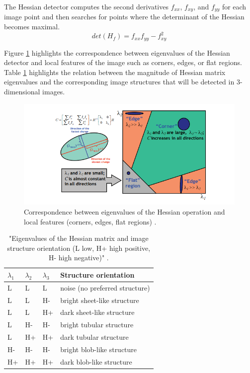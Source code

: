 The Hessian detector computes the second derivatives $f_{xx}$, $f_{xy}$, and $f_{yy}$ for each image point and then searches for points where the determinant of the Hessian becomes maximal.
\begin{equation}
det(H_f)= f_{xx}f_{yy}-f_{xy}^2
\end{equation}

Figure \ref{fig:hessian_app} highlights the correspondence between eigenvalues of the Hessian detector and local features of the image such as corners, edges, or flat regions. Table \ref{tab:hessian} highlights the relation between the magnitude of Hessian matrix eigenvalues and the corresponding image structures that will be detected in 3-dimensional images.

\begin{figure}[H] 
	\centering
	\includegraphics[width=1\textwidth]{hessian_app.png} 
	\caption{Correspondence between eigenvalues of the Hessian operation and local features (corners, edges, flat regions) \citep{grauman2011visual}.}
	\label{fig:hessian_app}
\end{figure}


\begin{table}[H]
\centering
\caption{"Eigenvalues of the Hessian matrix and image structure
orientation (L low, H+ high positive, H- high negative)" \citep{rudzki2009vessel}.}
\label{tab:hessian}
\begin{tabular}{@{}llll@{}}
\toprule
$\lambda_1$ & $\lambda_2$ & $\lambda_3$ & Structure orientation          \\ \midrule
L           & L           & L           & noise (no preferred structure) \\
L           & L           & H-          & bright sheet-like structure    \\
L           & L           & H+          & dark sheet-like structure      \\
L           & H-          & H-          & bright tubular structure       \\
L           & H+          & H+          & dark tubular structure         \\
H-          & H-          & H-          & bright blob-like structure     \\
H+          & H+          & H+          & dark blob-like structure       \\ \bottomrule
\end{tabular}
\end{table}

